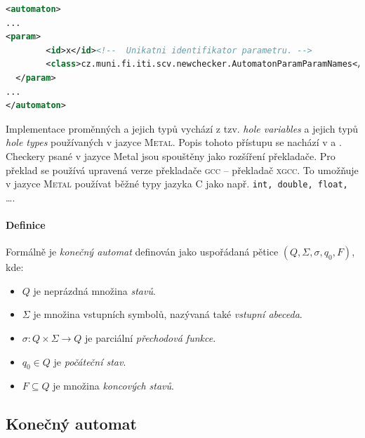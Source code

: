 \documentclass[11pt,final,oneside]{fithesis}
\begin{document}
\begin{lstlisting}[language=XML]
<automaton>
...
<param>
        <id>x</id><!--  Unikatni identifikator parametru. -->
        <class>cz.muni.fi.iti.scv.newchecker.AutomatonParamParamNames</class><!-- Udava typ parametru -->
  </param>
...
</automaton>
\end{lstlisting}


Implementace proměnných a jejich typů vychází z tzv. \emph{hole variables} a jejich typů \emph{hole types} používaných v jazyce \textsc{Metal}. Popis tohoto přístupu se nachází v \cite{engler-pldi} a \cite{engler-paste}. Checkery psané v jazyce Metal jsou spouštěny jako rozšíření překladače. Pro překlad se používá upravená verze překladače \textsc{gcc} -- překladač \textsc{xgcc}. To umožňuje v jazyce \textsc{Metal} používat běžné typy jazyka C jako např. {\tt int, double, float,} \ldots.

\newpage
\paragraph{Definice}\cite{aag} Formálně je \emph{konečný automat} definován jako uspořádaná pětice $(Q, \Sigma, \sigma, q_0, F)$, kde:
\begin{itemize}
	\item $Q$ je neprázdná množina \emph{stavů}.
	\item $\Sigma$ je množina vstupních symbolů, nazývaná také \emph{vstupní abeceda}.
	\item $\sigma: Q \times \Sigma \rightarrow Q$ je parciální \emph{přechodová funkce}.  
    \item $q_0 \in Q$ je \emph{počáteční stav}.
	\item $F \subseteq Q$ je množina \emph{koncových stavů}. 
\end{itemize}

\subsection{Konečný automat}
\end{document}
